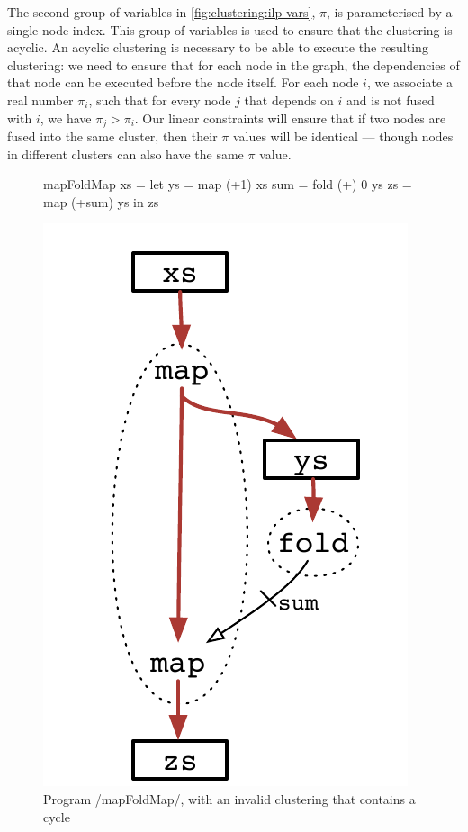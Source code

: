 The second group of variables in \cref{fig:clustering:ilp-vars}, $\pi$, is parameterised by a single node index.
This group of variables is used to ensure that the clustering is acyclic.
An acyclic clustering is necessary to be able to execute the resulting clustering: we need to ensure that for each node in the graph, the dependencies of that node can be executed before the node itself.
For each node $i$, we associate a real number $\pi_i$, such that for every node $j$ that depends on $i$ and is not fused with $i$, we have $\pi_j > \pi_i$.
Our linear constraints will ensure that if two nodes are fused into the same cluster, then their $\pi$ values will be identical --- though nodes in different clusters can also have the same $\pi$ value.

\begin{figure}
\begin{minipage}{0.5\textwidth}
\begin{haskell}
mapFoldMap xs 
 = let ys  = map  (+1)   xs
       sum = fold (+) 0  ys
       zs  = map  (+sum) ys
   in  zs
\end{haskell}
\end{minipage}
\begin{minipage}{0.5\textwidth}
\begin{center}
\includegraphics[scale=0.7]{copy/03-body/clustering/figures/ex3-cyclic.pdf}
\end{center}
\end{minipage}
\caption{Program \Hs/mapFoldMap/, with an invalid clustering that contains a cycle}
\label{clustering:f:cyclic}
\end{figure}


